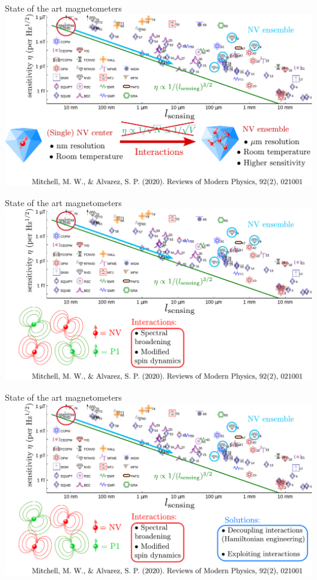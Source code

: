 \documentclass{beamer}
\begin{document}
\begin{frame}{State of the art magnetometers}
\centering
\includegraphics[width=\textwidth,height=0.85\textheight,keepaspectratio]{Slide_quantum_magnetometers_NV_n}
\end{frame}

\begin{frame}{State of the art magnetometers}
\centering
\includegraphics[width=\textwidth,height=0.85\textheight,keepaspectratio]{Slide_quantum_magnetometers_NV_n+1}
\end{frame}

\begin{frame}{State of the art magnetometers}
\centering
\includegraphics[width=\textwidth,height=0.85\textheight,keepaspectratio]{Slide_quantum_magnetometers_NV_n+2}
\end{frame}
\end{document}
